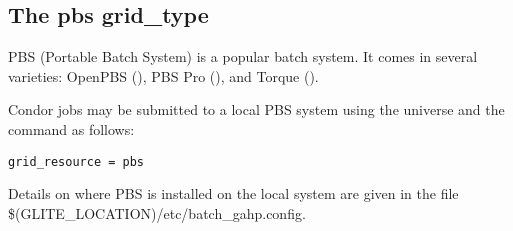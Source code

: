 
\subsection{\label{sec:PBS}The pbs grid\_type }

PBS (Portable Batch System) is a popular batch system. It comes in
several varieties: OpenPBS (),
PBS Pro (), and
Torque
().

Condor jobs may be submitted to a local PBS system
using the  universe and the
 command as follows:
\begin{verbatim}
grid_resource = pbs
\end{verbatim}

Details on where PBS is installed on the local system are
given in the file \$(GLITE\_LOCATION)/etc/batch_gahp.config.
